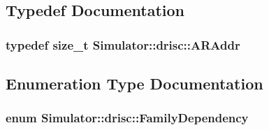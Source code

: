 \subsection{Typedef Documentation}
\hypertarget{namespace_simulator_1_1drisc_ad67fa6022bb8dfc914132e37bbba2e97}{
\subsubsection[{A\+R\+Addr}]{\setlength{\rightskip}{0pt plus 5cm}typedef size\+\_\+t {\bf Simulator\+::drisc\+::\+A\+R\+Addr}}}\label{namespace_simulator_1_1drisc_ad67fa6022bb8dfc914132e37bbba2e97}


\subsection{Enumeration Type Documentation}
\hypertarget{namespace_simulator_1_1drisc_ac6be077f11d2c5eb93b6ce2371bf67f4}{
\subsubsection[{Family\+Dependency}]{\setlength{\rightskip}{0pt plus 5cm}enum {\bf Simulator\+::drisc\+::\+Family\+Dependency}}}\label{namespace_simulator_1_1drisc_ac6be077f11d2c5eb93b6ce2371bf67f4}

